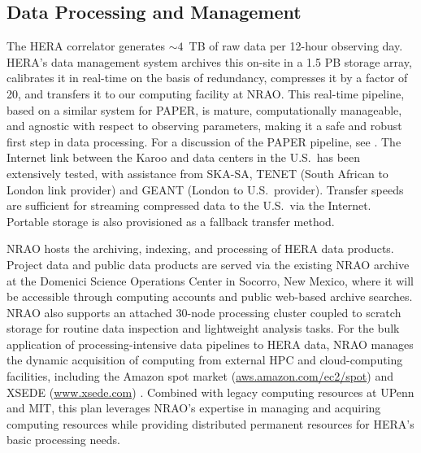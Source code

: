 \documentclass[preprint,11pt]{aastex}
\begin{document}
\subsection{Data Processing and Management}
\label{sec:data}
\noindent The HERA correlator generates $\sim4$~TB of raw data per 12-hour observing day.
HERA's data management system archives this on-site in a 1.5 PB storage array, calibrates it in real-time
on the basis of redundancy, compresses it by a factor of 20, and transfers it to our computing facility at NRAO.
This real-time pipeline, based on a similar system for PAPER, is mature, computationally manageable, and 
agnostic with respect to observing parameters, making it a safe and robust first step in data processing.  For a discussion
of the PAPER pipeline, see
\cite{zheng_et_al2014,parsons_etal2014,ali_et_al2015}.
The Internet link between the Karoo and data centers in the U.S.\ has been extensively tested, with assistance from SKA-SA, TENET
(South African to London link provider) and GEANT (London to U.S.\ provider).   
Transfer speeds are sufficient for streaming compressed data to the U.S.\ via the Internet. Portable storage is also
provisioned as a fallback transfer method.

NRAO hosts the archiving, indexing, and processing of HERA data products. 
Project data and public data products are served via the existing 
NRAO archive at the Domenici Science Operations Center %
in Socorro, New Mexico, where it will be accessible through computing accounts and public web-based
archive searches.
NRAO also supports
an attached 30-node processing cluster 
coupled to 
scratch storage
for routine data inspection and lightweight analysis tasks.
For the bulk application of processing-intensive data pipelines to HERA data,
NRAO manages the dynamic acquisition of computing from
external HPC and cloud-computing facilities, including the Amazon spot market (\url{aws.amazon.com/ec2/spot}) and XSEDE (\url{www.xsede.com}) . 
Combined with legacy computing resources at UPenn and MIT, this plan leverages NRAO's
expertise in managing and acquiring computing resources while providing distributed
permanent resources for HERA's basic processing needs.


\end{document}
